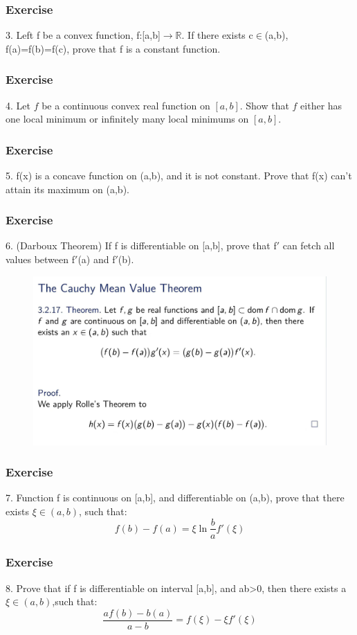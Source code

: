 \documentclass{beamer}
\begin{document}
\begin{frame}
    \frametitle{Exercise}
    3. Left f be a convex function, f:[a,b]$\rightarrow\mathbb{R}$. If there exists c$\in$(a,b), f(a)=f(b)=f(c), prove that f is a constant function.
\end{frame}
\begin{frame}
    \frametitle{Exercise}
    4. Let $f$ be a continuous convex real function on $[a,b]$. Show that $f$ either has one local minimum or infinitely many local minimums on $[a,b]$.
\end{frame}
\begin{frame}
    \frametitle{Exercise}
    5. f(x) is a concave function on (a,b), and it is not constant. Prove that f(x) can't attain its maximum on (a,b).
\end{frame}
\begin{frame}
    \frametitle{Exercise}
    6. (Darboux Theorem)
    If f is differentiable on [a,b], prove that f$'$ can fetch all values between f$'$(a) and f$'$(b).
\end{frame}
\begin{frame}
    \begin{figure}[htbp]
        \centering
        \includegraphics[width=12cm]{cauchy.jpg}
    \end{figure}
\end{frame}

\begin{frame}
    \frametitle{Exercise}
    7. Function f is continuous on [a,b], and differentiable on (a,b), prove that there exists $\xi\in(a,b)$, such that:
    \begin{equation*}
        f(b)-f(a)=\xi \ln\frac{b}{a}f'(\xi)
    \end{equation*}
\end{frame}

\begin{frame}
    \frametitle{Exercise}
    8. Prove that if f is differentiable on interval [a,b], and ab>0, then there exists a $\xi\in(a,b)$,such that:
    \begin{equation*}
        \frac{af(b)-b(a)}{a-b}=f(\xi)-\xi f'(\xi)
    \end{equation*}
\end{frame}
\end{document}
